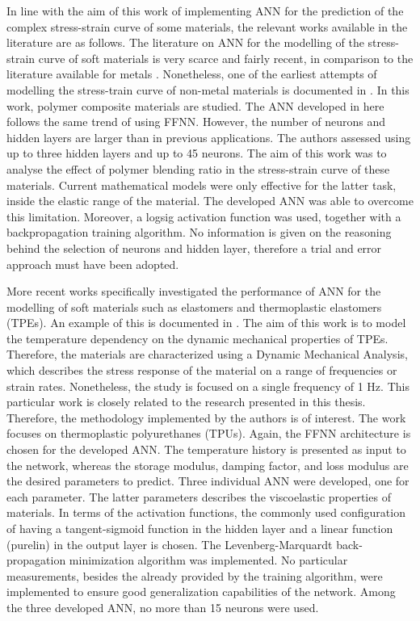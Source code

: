 In line with the aim of this work of implementing ANN for the prediction of the complex stress-strain curve of some materials, the relevant works available in the literature are as follows. The literature on ANN for the modelling of the stress-strain curve of soft materials is very scarce and fairly recent, in comparison to the literature available for metals \cite{ altinkok2005use,setti2014artificial, jenik2017sequential}. Nonetheless, one of the earliest attempts of modelling the stress-train curve of non-metal materials is documented in \cite{yousef2011prediction}. In this work, polymer composite materials are studied. The ANN developed in here follows the same trend of using FFNN. However, the number of neurons and hidden layers are larger than in previous applications. The authors assessed using up to three hidden layers and up to 45 neurons. The aim of this work was to analyse the effect of polymer blending ratio in the stress-strain curve of these materials. Current mathematical models were only effective for the latter task, inside the elastic range of the material. The developed ANN was able to overcome this limitation. Moreover, a logsig activation function was used, together with a backpropagation training algorithm. No information is given on the reasoning behind the selection of neurons and hidden layer, therefore a trial and error approach must have been adopted. 

More recent works specifically investigated the performance of ANN for the modelling of soft materials such as elastomers and thermoplastic elastomers (TPEs). An example of this is documented in \cite{kopal2017modeling}. The aim of this work is to model the temperature dependency on the dynamic mechanical properties of TPEs. Therefore, the materials are characterized using a Dynamic Mechanical Analysis, which describes the stress response of the material on a range of frequencies or strain rates. Nonetheless, the study is focused on a single frequency of 1 Hz. This particular work is closely related to the research presented in this thesis. Therefore, the methodology implemented by the authors is of interest. The work focuses on thermoplastic polyurethanes (TPUs). Again, the FFNN architecture is chosen for the developed ANN. The temperature history is presented as input to the network, whereas the storage modulus, damping factor, and loss modulus are the desired parameters to predict. Three individual ANN were developed, one for each parameter. The latter parameters describes the viscoelastic properties of materials. In terms of the activation functions, the commonly used configuration of having a tangent-sigmoid function in the hidden layer and a linear function (purelin) in the output layer is chosen. The Levenberg-Marquardt back-propagation minimization algorithm was implemented. No particular measurements, besides the already provided by the training algorithm, were implemented to ensure good generalization capabilities of the network. Among the three developed ANN, no more than 15 neurons were used.

